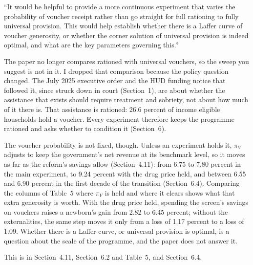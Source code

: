\documentclass[11pt]{article}
\begin{document}
\begin{referee}
``It would be helpful to provide a more continuous experiment that varies the
probability of voucher receipt rather than go straight for full rationing to fully
universal provision. This would help establish whether there is a Laffer curve of
voucher generosity, or whether the corner solution of universal provision is indeed
optimal, and what are the key parameters governing this.''
\end{referee}
\begin{response}
\open The paper no longer compares rationed with universal vouchers, so the sweep you
suggest is not in it. I dropped that comparison because the policy question changed.
The July 2025 executive order and the HUD funding notice that followed it, since struck
down in court (Section~1), are about whether the assistance that exists should require
treatment and sobriety, not about how much of it there is. That assistance is rationed:
26.6 percent of income eligible households hold a voucher. Every experiment therefore keeps the programme
rationed and asks whether to condition it (Section~6).

The voucher probability is not fixed, though. Unless an experiment holds it, $\pi_V$
adjusts to keep the government's net revenue at its benchmark level, so it moves as
far as the reform's savings allow (Section~4.11): from 6.75 to 7.80 percent in the main
experiment, to 9.24 percent with the drug price held, and between 6.55 and 6.90 percent
in the first decade of the transition (Section~6.4). Comparing the columns of Table~5
where $\pi_V$ is held and where it clears shows what that extra generosity is worth.
With the drug price held, spending the screen's savings on vouchers raises a newborn's
gain from 2.82 to 6.45 percent; without the externalities, the same step moves it only
from a loss of 1.17 percent to a loss of 1.09. Whether there is a Laffer curve, or
universal provision is optimal, is a question about the scale of the programme, and
the paper does not answer it.

This is in Section~4.11, Section~6.2 and Table~5, and Section~6.4.
\end{response}
\end{document}
